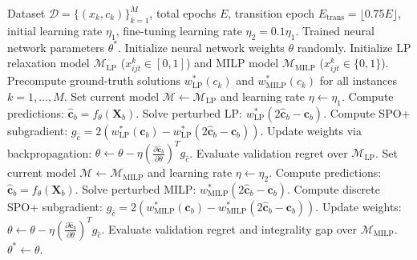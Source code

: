 \documentclass[11pt,a4paper]{article}
\theoremstyle{definition}
\theoremstyle{remark}
\begin{document}
\begin{algorithm}[H]
\caption{Two-Phase DFL Training with LP Warmup and MILP Fine-Tuning}
\label{alg:two_phase}
\begin{algorithmic}[1]
\Require Dataset $\mathcal{D} = \{(x_k, c_k)\}_{k=1}^M$, total epochs $E$, transition epoch $E_{\text{trans}} = \lfloor 0.75 E \rfloor$, initial learning rate $\eta_1$, fine-tuning learning rate $\eta_2 = 0.1 \eta_1$.
\Ensure Trained neural network parameters $\theta^*$.
\State Initialize neural network weights $\theta$ randomly.
\State Initialize LP relaxation model $\mathcal{M}_{\text{LP}}$ ($x_{ijt}^k \in [0, 1]$) and MILP model $\mathcal{M}_{\text{MILP}}$ ($x_{ijt}^k \in \{0, 1\}$).
\State Precompute ground-truth solutions $w_{\text{LP}}^*(c_k)$ and $w_{\text{MILP}}^*(c_k)$ for all instances $k = 1, \dots, M$.
\Statex {}
    \State Set current model $\mathcal{M} \leftarrow \mathcal{M}_{\text{LP}}$ and learning rate $\eta \leftarrow \eta_1$.
        \State Compute predictions: $\hat{\mathbf{c}}_b = f_\theta(\mathbf{X}_b)$.
        \State Solve perturbed LP: $w_{\text{LP}}^*(2\hat{\mathbf{c}}_b - \mathbf{c}_b)$.
        \State Compute SPO+ subgradient: $g_{\hat{c}} = 2(w_{\text{LP}}^*(\mathbf{c}_b) - w_{\text{LP}}^*(2\hat{\mathbf{c}}_b - \mathbf{c}_b))$.
        \State Update weights via backpropagation: $\theta \leftarrow \theta - \eta \left( \frac{\partial \hat{\mathbf{c}}_b}{\partial \theta} \right)^T g_{\hat{c}}$.
    \EndFor
    \State Evaluate validation regret over $\mathcal{M}_{\text{LP}}$.
\EndFor
\Statex {}
    \State Set current model $\mathcal{M} \leftarrow \mathcal{M}_{\text{MILP}}$ and learning rate $\eta \leftarrow \eta_2$.
        \State Compute predictions: $\hat{\mathbf{c}}_b = f_\theta(\mathbf{X}_b)$.
        \State Solve perturbed MILP: $w_{\text{MILP}}^*(2\hat{\mathbf{c}}_b - \mathbf{c}_b)$.
        \State Compute discrete SPO+ subgradient: $g_{\hat{c}} = 2(w_{\text{MILP}}^*(\mathbf{c}_b) - w_{\text{MILP}}^*(2\hat{\mathbf{c}}_b - \mathbf{c}_b))$.
        \State Update weights: $\theta \leftarrow \theta - \eta \left( \frac{\partial \hat{\mathbf{c}}_b}{\partial \theta} \right)^T g_{\hat{c}}$.
    \EndFor
    \State Evaluate validation regret and integrality gap over $\mathcal{M}_{\text{MILP}}$.
\EndFor
\State \Return $\theta^* \leftarrow \theta$.
\end{algorithmic}
\end{algorithm}
\end{document}
